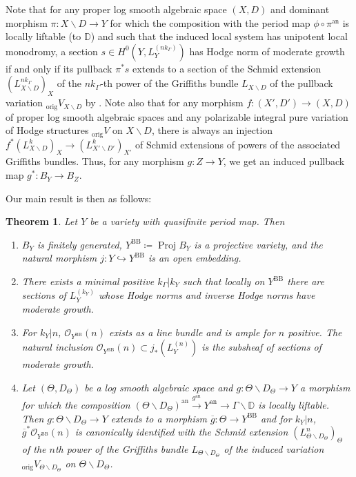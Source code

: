 \documentclass{amsart}
\newcommand{\bs}{\backslash}
\newcommand{\proj}{\operatorname{Proj}}
\newcommand{\an}{\operatorname{an}}
\newcommand{\ol}{\overline}
\newtheorem{thm}[theorem]{Theorem}
\theoremstyle{definition}
\theoremstyle{remark}
\def\bD{\mathbb{D}}
\def\cO{\mathcal{O}}
\def\an{\mathrm{an}}
\def\orig{\mathrm{orig}}
\def\BB{\mathrm{BB}}
\renewcommand{\bar}[1]{\ol{#1}}
\numberwithin{equation}{section}
\def\testsp{\Theta}
\begin{document}
Note that for any proper log smooth algebraic space $(X,D)$ and dominant morphism $\pi:X\backslash D\to Y$ for which the composition with the period map $\phi\circ \pi^\an$ is locally liftable (to $\bD$) and such that the induced local system has unipotent local monodromy, a section $s\in H^0(Y,L_Y^{(nk_\Gamma)})$ has Hodge norm of moderate growth if and only if its pullback $\pi^*s$ extends to a section of the Schmid extension $(L^{nk_\Gamma}_{X\bs D})_X$ of the $nk_\Gamma$-th power of the Griffiths bundle $L_{X\bs D}$ of the pullback variation $_\orig V_{X\bs D}$ by \cite{kashiwara}. Note also that for any morphism $f:(X',D')\to (X,D)$ of proper log smooth algebraic spaces and any polarizable integral pure variation of Hodge structures $_\orig V$ on $X\bs D$, there is always an injection $f^*(L^k_{X\bs D})_X\to (L^k_{X'\bs D'})_{X'}$ of Schmid extensions of powers of the associated Griffiths bundles.  Thus, for any morphism $g:Z\to Y$, we get an induced pullback map
$g^*:B_Y\to B_Z$.

Our main result is then as follows:

\begin{thm}\label{thm:bailyborel}
Let $Y$ be a variety with quasifinite period map. Then

\begin{enumerate}

\item $B_Y$ is finitely generated, $Y^{\BB}\coloneqq  \proj B_Y$ is a projective variety, and the natural morphism $j:Y\hookrightarrow Y^{\BB}$ is an open embedding.

\item There exists a minimal positive $k_\Gamma| k_Y$ such that locally on $Y^{\BB}$ there are sections of $L_Y^{(k_Y)}$ whose Hodge norms and inverse Hodge norms have moderate growth.

\item For $k_Y|n$, $\cO_{Y^{\BB}}(n)$ exists as a line bundle and is ample for $n$ positive.  The natural inclusion $\cO_{Y^\BB}(n)\subset j_*(L_Y^{(n)})$ is the subsheaf of sections of moderate growth. 
\item 
Let $(\testsp,D_\testsp)$ be a log smooth algebraic space and $g: \testsp\bs D_\testsp\to Y$ a morphism for which the composition $(\testsp\bs D_\testsp)^\an\xrightarrow{g^\an}Y^\an\to \Gamma\bs \bD$ is locally liftable.  Then $g: \testsp\bs D_\testsp\to Y$ extends to a morphism $\bar g:\testsp\to Y^\BB$ and for $k_Y|n$, $\bar g^*\cO_{Y^\BB}(n)$ is canonically identified with the Schmid extension $(L^n_{\testsp\bs D_\testsp})_\testsp$ of the $n$th power of the Griffiths bundle $L_{\testsp\bs D_\testsp}$ of the induced variation $_\orig V_{\testsp\bs D_\testsp}$ on $\testsp\bs D_\testsp$.

\end{enumerate}
\end{thm}
\end{document}
